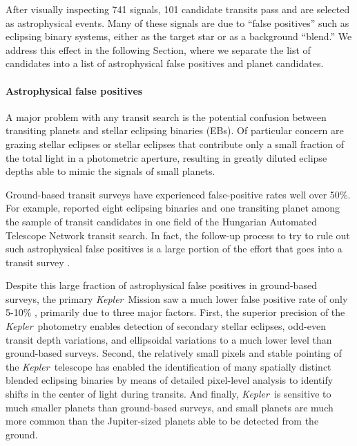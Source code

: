 \documentclass[12pt,preprint]{aastex}
\newcommand{\project}[1]{\textsl{#1}} %
\newcommand{\kepler}{\project{Kepler}}
\newcommand{\sectionname}{Section}
\begin{document}
After visually inspecting 741 signals, 101 candidate transits pass and are
selected as astrophysical events.
Many of these signals are due to ``false positives'' such as eclipsing binary
systems, either as the target star or as a background ``blend.'' We address
this effect in the following \sectionname, where we separate the list of
candidates into a list of astrophysical false positives and planet candidates.


\paragraph{Astrophysical false positives}

A major problem with any transit search is the potential confusion
between transiting planets and stellar eclipsing binaries (EBs).  Of
particular concern are grazing stellar eclipses or stellar eclipses
that contribute only a small fraction of the total light in a
photometric aperture, resulting in greatly diluted eclipse depths able
to mimic the signals of small planets.

Ground-based transit surveys have experienced false-positive rates
well over 50\%.  For example, \citet{Latham:2009} reported eight
eclipsing binaries and one transiting planet among the sample of
transit candidates in one field of the Hungarian Automated Telescope
Network transit search.  In fact, the follow-up process to try to rule
out such astrophysical false positives is a large portion of the
effort that goes into a transit survey
\citep[e.g.,][]{Odonovan:2006,Almenara:2009,Poleski:2010}.

Despite this large fraction of astrophysical false positives in
ground-based surveys, the primary \kepler\ Mission saw a much lower
false positive rate of only 5-10\% \citep{Morton:2011, Fressin:2013},
primarily due to three major factors.  First, the superior precision
of the \kepler\ photometry enables detection of secondary stellar
eclipses, odd-even transit depth variations, and ellipsoidal
variations \citep{Batalha:2010} to a much lower level than
ground-based surveys. Second, the relatively small pixels and stable
pointing of the \kepler\ telescope has enabled the identification of
many spatially distinct blended eclipsing binaries by means of
detailed pixel-level analysis \citep{Bryson:2013} to identify shifts
in the center of light during transits.  And finally, \kepler\ is
sensitive to much smaller planets than ground-based surveys, and small
planets are much more common than the Jupiter-sized planets able to be
detected from the ground.
\end{document}

